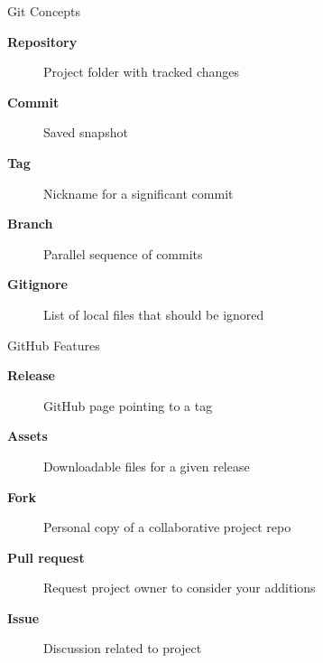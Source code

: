\documentclass[aspectratio=169]{beamer}
\begin{document}



\begin{frame}{Git Concepts}\small
  \begin{description}
    \item[\bf\darkblue Repository] Project folder with tracked changes
    \\[5ex]
    \item[\bf\darkblue Commit] Saved snapshot \\[5ex]
    \item[\bf\darkblue Tag] Nickname for a significant commit \\[5ex]
    \item[\bf\darkblue Branch] Parallel sequence of commits \\[5ex]
    \item[\bf\darkblue Gitignore] List of local files that should be ignored
  \end{description}
\end{frame}

\begin{frame}{GitHub Features}\small
  \begin{description}
    \item[\bf\darkblue Release] GitHub page pointing to a tag
    \\[5ex]
    \item[\bf\darkblue Assets] Downloadable files for a given release
    \\[5ex]
    \item[\bf\darkblue Fork] Personal copy of a collaborative project repo
    \\[5ex]
    \item[\bf\darkblue Pull request] Request project owner to consider your
    additions \\[5ex]
    \item[\bf\darkblue Issue] Discussion related to project 
  \end{description}
\end{frame}
\end{document}
